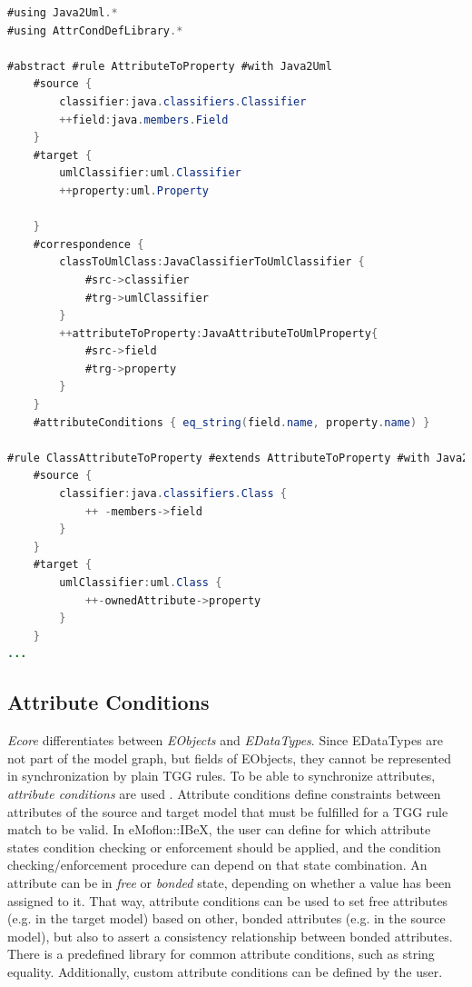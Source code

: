 \begin{lstlisting}[language=java, caption={Rule defition in eMoflon::IBeX: correspondence relationships can only refer to correspondence classes defined in the \emph{schema} (see \autoref{foundationsEmoflonSchema}). Rules can be abstract and concrete. Inheritance is possible.}, captionpos=b, label=foundationsEmoflonRuleExample]
#using Java2Uml.*
#using AttrCondDefLibrary.*

#abstract #rule AttributeToProperty #with Java2Uml
	#source { 
		classifier:java.classifiers.Classifier
		++field:java.members.Field 
	}
	#target {
		umlClassifier:uml.Classifier
		++property:uml.Property
		
	}
	#correspondence {
		classToUmlClass:JavaClassifierToUmlClassifier {
			#src->classifier
			#trg->umlClassifier
		}
		++attributeToProperty:JavaAttributeToUmlProperty{
			#src->field
			#trg->property
		}
	}
	#attributeConditions { eq_string(field.name, property.name) }

#rule ClassAttributeToProperty #extends AttributeToProperty #with Java2Uml
	#source {
		classifier:java.classifiers.Class {
			++ -members->field
		}
	}
	#target {
		umlClassifier:uml.Class {
			++-ownedAttribute->property
		}
	}
...
\end{lstlisting}




\subsection{Attribute Conditions}
\label{sec:Foundations:eMoflon:attributeConditions}
\emph{Ecore} differentiates between \emph{EObjects} and \emph{EDataTypes}.
Since EDataTypes are not part of the model graph, but fields of EObjects, they cannot be represented in synchronization by plain TGG rules.
To be able to synchronize attributes, \emph{attribute conditions} are used \cite{eMoflonIBeX_weidmann_incremental_nodate, emoflon_tutorial}. 
Attribute conditions define constraints between attributes of the source and target model that must be fulfilled for a TGG rule match to be valid.
In eMoflon::IBeX, the user can define for which attribute states condition checking or enforcement should be applied, and the condition checking/enforcement procedure can depend on that state combination.
An attribute can be in \emph{free} or \emph{bonded} state, depending on whether a value has been assigned to it.
That way, attribute conditions can be used to set free attributes (e.g. in the target model) based on other, bonded attributes (e.g. in the source model), but also to assert a consistency relationship between bonded attributes.
There is a predefined library for common attribute conditions, such as string equality. 
Additionally, custom attribute conditions can be defined by the user.



